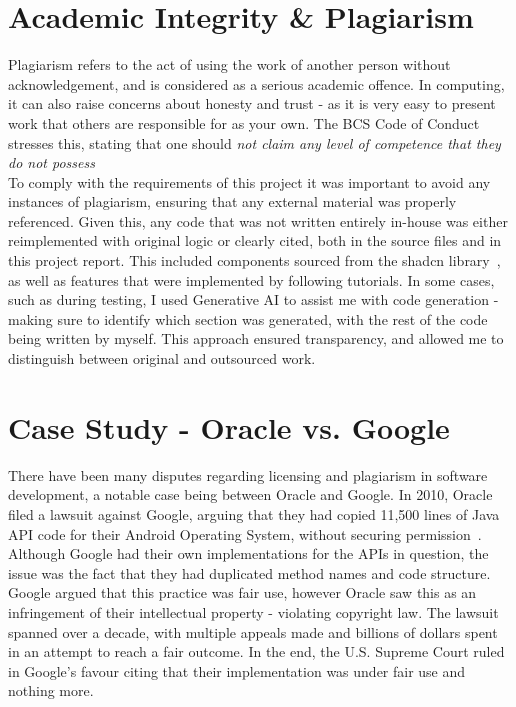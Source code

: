 \documentclass[]{final_report}
\begin{document}
\section{Academic Integrity \& Plagiarism}

Plagiarism refers to the act of using the work of another person without acknowledgement, and is considered as a serious academic offence. In computing, it can also raise concerns about honesty and trust - as it is very easy to present work that others are responsible for as your own. The BCS Code of Conduct stresses this, stating that one should \textit{not claim any level of competence that they do not possess}~\cite{BCS}\\

To comply with the requirements of this project it was important to avoid any instances of plagiarism, ensuring that any external material was properly referenced. Given this, any code that was not written entirely in-house was either reimplemented with original logic or clearly cited, both in the source files and in this project report. This included components sourced from the shadcn library~\cite{SHADCN}, as well as features that were implemented by following tutorials. In some cases, such as during testing, I used Generative AI to assist me with code generation - making sure to identify which section was generated, with the rest of the code being written by myself. This approach ensured transparency, and allowed me to distinguish between original and outsourced work.

\section{Case Study - Oracle vs. Google}

There have been many disputes regarding licensing and plagiarism in software development, a notable case being between Oracle and Google. In 2010, Oracle filed a lawsuit against Google, arguing that they had copied 11,500 lines of Java API code for their Android Operating System, without securing permission~\cite{ORACLE_VS_GOOGLE}. Although Google had their own implementations for the APIs in question, the issue was the fact that they had duplicated method names and code structure. Google argued that this practice was fair use, however Oracle saw this as an infringement of their intellectual property - violating copyright law. The lawsuit spanned over a decade, with multiple appeals made and billions of dollars spent in an attempt to reach a fair outcome. In the end, the U.S. Supreme Court ruled in Google's favour citing that their implementation was under fair use and nothing more.\\
\end{document}

